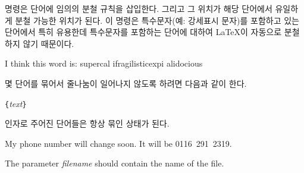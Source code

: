 \ci{-} 명령은 단어에 임의의 분철 규칙을 삽입한다. 그리고 그 위치가 해당 단어에서 유일하게 분철 가능한 위치가 된다.
이 명령은 특수문자(예: 강세표시 문자)를 포함하고 있는 단어에서 특히 유용한데 특수문자를 포함하는 단어에 대하여 
\LaTeX 이 자동으로 분철하지 않기 때문이다.

\begin{example}
I think this word is: su\-per\-cal\-%
i\-frag\-i\-lis\-tic\-ex\-pi\-%
al\-i\-do\-cious
\end{example}

몇 단어를 묶어서 줄나눔이 일어나지 않도록 하려면 다음과 같이 한다.
\begin{lscommand}
\verb|{|\emph{text}\verb|}|
\end{lscommand}
\noindent 인자로 주어진 단어들은 항상 묶인 상태가 된다.





\begin{example}
My phone number will change soon.
It will be \mbox{0116 291 2319}.

The parameter
\mbox{\emph{filename}} should
contain the name of the file.
\end{example}

